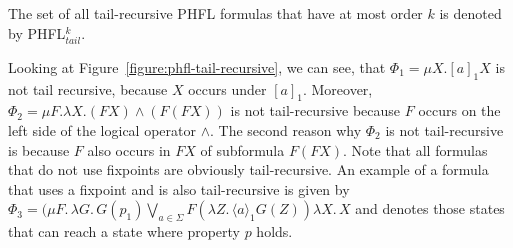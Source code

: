 The set of all tail-recursive PHFL formulas that have at most order $k$ is denoted by PHFL$^k_{tail}$.

\begin{example}{\cite{lange2014capturing}}
    Looking at Figure~\ref{figure:phfl-tail-recursive}, we can see, that $\Phi_1 = \mu X.[a]_1 X$ is not tail
    recursive, because $X$ occurs under $[a]_1$. Moreover, $\Phi_2 = \mu F .\lambda X. (F X) \wedge (F(F X))$
    is not tail-recursive because $F$ occurs on the left side of the logical operator $\wedge$. The second reason why
    $\Phi_2$ is not tail-recursive is because $F$ also occurs in $F X$ of subformula $F (F X)$. 
    Note that all formulas that do not use fixpoints are obviously tail-recursive. An 
    example of a formula that uses a fixpoint and is also tail-recursive is given by 
    $\Phi_3 = (\mu F.\,\lambda G.\,G(p_1) \underset{a \in \Sigma}{\bigvee} F (\lambda Z.\,\langle a \rangle_1  G(Z)) \lambda X.\, X$ and denotes those states that can reach a state where property $p$ holds.
\end{example}
